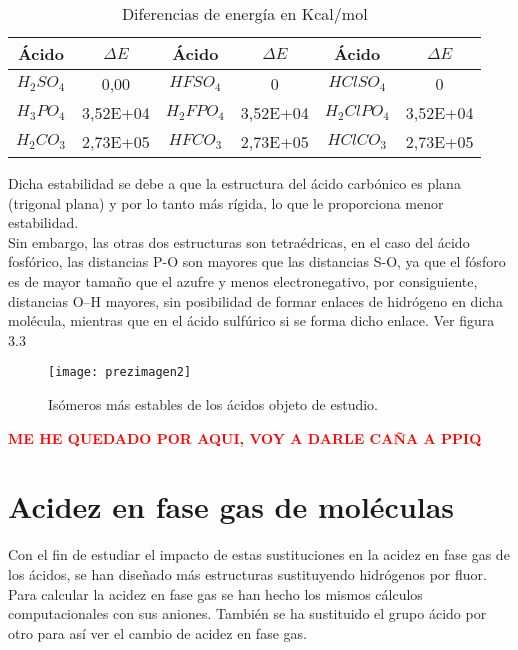 \begin{table}[H]
	\centering
	\begin{tabular}{|c|c|c|c|c|c|}
		\hline
Ácido&$\Delta E$&Ácido&$\Delta E$& Ácido&$\Delta E$\\ \hline
$H_2SO_4$&0,00&$HFSO_4$&0&$HClSO_4$&0\\ \hline
$H_3PO_4$&3,52E+04&$H_2FPO_4$&3,52E+04&$H_2ClPO_4$&3,52E+04\\ \hline
$H_2CO_3$&2,73E+05&$HFCO_3$&2,73E+05&$HClCO_3$&2,73E+05\\ \hline
	\end{tabular}
	\caption{Diferencias de energía en Kcal/mol}
\end{table}
Dicha estabilidad se debe a que la estructura del ácido carbónico es plana (trigonal plana) y por lo tanto más rígida, lo que le proporciona menor estabilidad.\\ Sin embargo, las otras dos estructuras son tetraédricas, en el caso del ácido fosfórico, las distancias P-O son mayores que las distancias S-O, ya que el fósforo es de mayor tamaño que el azufre y menos electronegativo, por consiguiente, distancias O--H mayores, sin posibilidad de formar enlaces de hidrógeno en dicha molécula, mientras que en el ácido sulfúrico si se forma dicho enlace. Ver figura 3.3
\begin{figure}[H]
	\centering
	\texttt{[image: prezimagen2]}
	\caption{Isómeros más estables  de los ácidos objeto de estudio.}
\end{figure}
{\bfseries\textcolor{red}{ME HE QUEDADO POR AQUI, VOY A DARLE CAÑA A PPIQ}}
\section{Acidez en fase gas de moléculas}

Con el fin de estudiar el impacto de estas sustituciones en la acidez en fase gas de los ácidos, se han diseñado más estructuras sustituyendo hidrógenos por fluor. Para calcular la acidez en fase gas se han hecho los mismos cálculos computacionales con sus aniones.
También se ha sustituido el grupo ácido por otro para así ver el cambio de acidez en fase gas.

